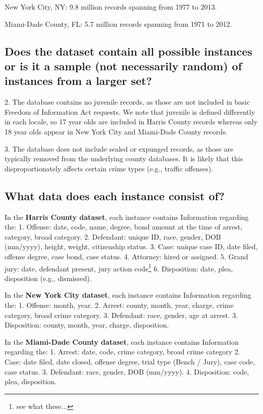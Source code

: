 \documentclass[letterpaper, 10 pt, conference]{ieeeconf}  %
\begin{document}
New York City, NY: 9.8 million records spanning from 1977 to 2013. 

Miami-Dade County, FL: 5.7 million records spanning from 1971 to 2012.

\subsection{Does the dataset contain all possible instances or is it a sample (not necessarily random) of instances from a larger set?}

2. The database contains no juvenile records, as those
are not included in basic Freedom of Information Act
requests. We note that juvenile is defined differently in
each locale, so 17 year olds are included in Harris
County records whereas only 18 year olds appear in
New York City and Miami-Dade County records.

3. The database does not include sealed or expunged
records, as those are typically removed from the
underlying county databases. It is likely that this
disproportionately affects certain crime types (e.g.,
traffic offenses).

\lipsum[1]

\subsection{What data does each instance consist of?}

In the \textbf{Harris County dataset}, each instance contains Information regarding the:
1. Offense: date, code, name, degree, bond amount at the time of arrest, category, broad category.
2. Defendant: unique ID, race, gender, DOB (mm/yyyy), height, weight, citizenship status.
3. Case: unique case ID, date filed, offense degree, case bond, case status.
4. Attorney: hired or assigned.
5. Grand jury: date, defendant present, jury action code\footnote{see what these... }
6. Disposition: date, plea, disposition (e.g., dismissed).

In the \textbf{New York City dataset}, each instance contains Information regarding the:
1. Offense: month, year.
2. Arrest: county, month, year, charge, crime category, broad crime category.
3. Defendant: race, gender, age at arrest.
3. Disposition: county, month, year, charge, disposition.

In the \textbf{Miami-Dade County dataset}, each instance contains Information regarding the:
1. Arrest: date, code, crime category, broad crime category
2. Case: date filed, date closed, offense degree, trial type (Bench / Jury), case code, case status.
3. Defendant: race, gender, DOB (mm/yyyy).
4. Disposition: code, plea, disposition.
\end{document}
